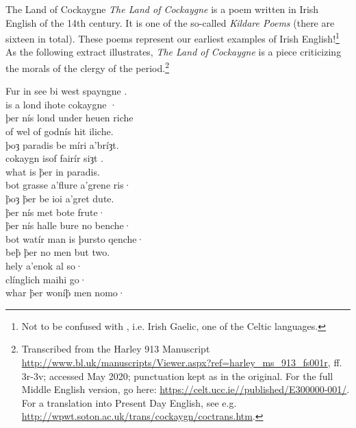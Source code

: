 \begin{texts}{The Land of Cockaygne}
\textit{The Land of Cockaygne} is a poem written in Irish English of the 14th century. It is one of the so-called \textit{Kildare Poems} (there are sixteen in total). These poems represent our earliest examples of Irish English!\footnote{Not to be confused with , i.e. Irish Gaelic, one of the Celtic languages.} As the following extract illustrates, \textit{The Land of Cockaygne} is a piece criticizing the morals of the clergy of the period.\footnote{Transcribed from the Harley 913 Manuscript \url{http://www.bl.uk/manuscripts/Viewer.aspx?ref=harley_ms_913_fs001r}, ff. 3r-3v; accessed May 2020; punctuation kept as in the original. For the full Middle English version, go here: \url{https://celt.ucc.ie//published/E300000-001/}. For a translation into Present Day English, see e.g. \url{http://wpwt.soton.ac.uk/trans/cockaygn/coctrans.htm}.}

\begin{textglossed}
  \internallinenumbers*{}
Fur in see bi west spayngne .\\
is a lond ihote cokaygne ·\\
þer nís lond under heuen riche\\
of wel of godnís hit iliche.\\
þoȝ paradis be míri a'bríȝt.\\
cokaygn isof fairír siȝt .\\
what is \.{þ}er in paradis.\\
bot grasse a'flure a'grene ris·\\
\.{þ}oȝ \.{þ}er be ioi a'gret dute.\\
\.{þ}er nís met bote frute·\\
\.{þ}er nís halle bure no benche·\\
bot watír man is þursto qenche·\\
be\.{þ} \.{þ}er no men but two.\\
hely a'enok al so·\\
clínglich maihi go·\\
whar \.{þ}er woní\.{þ} men nomo·


\end{textglossed}
\end{texts}
